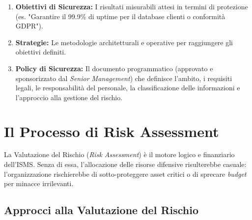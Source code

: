 \begin{enumerate}
    \item \textbf{Obiettivi di Sicurezza:} I risultati misurabili attesi in termini di protezione (es. "Garantire il 99.9\% di uptime per il database clienti o conformità GDPR").
    \item \textbf{Strategie:} Le metodologie architetturali e operative per raggiungere gli obiettivi definiti.
    \item \textbf{Policy di Sicurezza:} Il documento programmatico (approvato e sponsorizzato dal \textit{Senior Management}) che definisce l'ambito, i requisiti legali, le responsabilità del personale, la classificazione delle informazioni e l'approccio alla gestione del rischio.
\end{enumerate}

\section{Il Processo di Risk Assessment}
\begin{warnbox}
La Valutazione del Rischio (\textit{Risk Assessment}) è il motore logico e finanziario dell'ISMS. Senza di essa, l'allocazione delle risorse difensive risulterebbe casuale: l'organizzazione rischierebbe di sotto-proteggere asset critici o di sprecare \textit{budget} per minacce irrilevanti.
\end{warnbox}

\subsection{Approcci alla Valutazione del Rischio}

